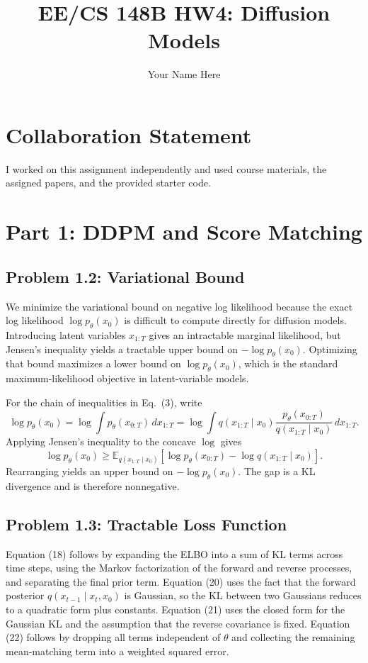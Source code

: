 \documentclass[11pt]{article}
\title{EE/CS 148B HW4: Diffusion Models}
\author{Your Name Here}
\date{}
\begin{document}
\maketitle

\section*{Collaboration Statement}
I worked on this assignment independently and used course materials, the assigned papers, and the provided starter code.

\section{Part 1: DDPM and Score Matching}

\subsection*{Problem 1.2: Variational Bound}
We minimize the variational bound on negative log likelihood because the exact log likelihood $\log p_\theta(x_0)$ is difficult to compute directly for diffusion models. Introducing latent variables $x_{1:T}$ gives an intractable marginal likelihood, but Jensen's inequality yields a tractable upper bound on $-\log p_\theta(x_0)$. Optimizing that bound maximizes a lower bound on $\log p_\theta(x_0)$, which is the standard maximum-likelihood objective in latent-variable models.

For the chain of inequalities in Eq.\ (3), write
\[
\log p_\theta(x_0)
= \log \int p_\theta(x_{0:T})\,dx_{1:T}
= \log \int q(x_{1:T}\mid x_0)\frac{p_\theta(x_{0:T})}{q(x_{1:T}\mid x_0)}\,dx_{1:T}.
\]
Applying Jensen's inequality to the concave $\log$ gives
\[
\log p_\theta(x_0)
\ge \mathbb{E}_{q(x_{1:T}\mid x_0)}\!\left[\log p_\theta(x_{0:T})-\log q(x_{1:T}\mid x_0)\right].
\]
Rearranging yields an upper bound on $-\log p_\theta(x_0)$. The gap is a KL divergence and is therefore nonnegative.

\subsection*{Problem 1.3: Tractable Loss Function}
Equation (18) follows by expanding the ELBO into a sum of KL terms across time steps, using the Markov factorization of the forward and reverse processes, and separating the final prior term. Equation (20) uses the fact that the forward posterior $q(x_{t-1}\mid x_t,x_0)$ is Gaussian, so the KL between two Gaussians reduces to a quadratic form plus constants. Equation (21) uses the closed form for the Gaussian KL and the assumption that the reverse covariance is fixed. Equation (22) follows by dropping all terms independent of $\theta$ and collecting the remaining mean-matching term into a weighted squared error.
\end{document}

